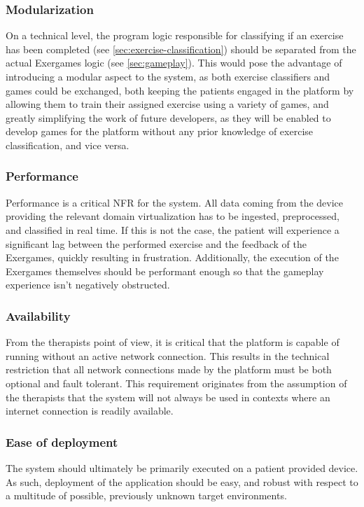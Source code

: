 \subsubsection{Modularization}
On a technical level, the program logic responsible for classifying if an exercise has been completed (see \ref{sec:exercise-classification}) should be separated from the actual Exergames logic (see \ref{sec:gameplay}). This would pose the advantage of introducing a modular aspect to the system, as both exercise classifiers and games could be exchanged, both keeping the patients engaged in the platform by allowing them to train their assigned exercise using a variety of games, and greatly simplifying the work of future developers, as they will be enabled to develop games for the platform without any prior knowledge of exercise classification, and vice versa.

\subsubsection{Performance}
Performance is a critical \gls{NFR} for the system. All data coming from the device providing the relevant domain virtualization has to be ingested, preprocessed, and classified in real time. If this is not the case, the patient will experience a significant lag between the performed exercise and the feedback of the Exergames, quickly resulting in frustration. Additionally, the execution of the Exergames themselves should be performant enough so that the gameplay experience isn't negatively obstructed. 

\subsubsection{Availability}
From the therapists point of view, it is critical that the platform is capable of running without an active network connection. This results in the technical restriction that all network connections made by the platform must be both optional and fault tolerant. This requirement originates from the assumption of the therapists that the system will not always be used in contexts where an internet connection is readily available.


\subsubsection{Ease of deployment}
The system should ultimately be primarily executed on a patient provided device. As such, deployment of the application should be easy, and robust with respect to a multitude of possible, previously unknown target environments.

